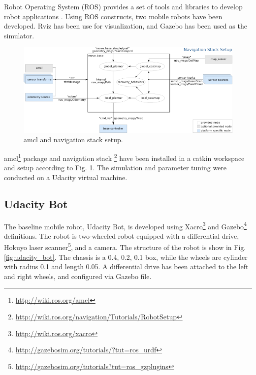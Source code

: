 \documentclass[10pt,journal,compsoc]{IEEEtran}
\begin{document}
Robot Operating System (ROS) provides a set of tools and libraries to develop robot applications \cite{288}. Using ROS constructs, two mobile robots have been developed.  Rviz has been use for visualization, and Gazebo has been used as the simulator. 

\begin{figure}[thpb]
      \centering
      \includegraphics[width=\linewidth]{misc/overview_tf_small.png}
      \caption{amcl and navigation stack setup.}
      \label{fig:nav_stack}
\end{figure}

amcl\footnote{\url{http://wiki.ros.org/amcl}} package and navigation stack \footnote{\url{http://wiki.ros.org/navigation/Tutorials/RobotSetup}} have been installed in a catkin workspace and setup according to Fig. \ref{fig:nav_stack}. The simulation and parameter tuning were conducted on a Udacity virtual machine.

\subsection{Udacity Bot}

The baseline mobile robot, Udacity Bot, is developed using Xacro\footnote{\url{http://wiki.ros.org/xacro}} and Gazebo\footnote{\url{http://gazebosim.org/tutorials/?tut=ros_urdf}} definitions. The robot is two-wheeled robot equipped with a differential drive, Hokuyo laser scanner\footnote{\url{http://gazebosim.org/tutorials?tut=ros_gzplugins}}, and a camera. The structure of the robot is show in Fig. \ref{fig:udacity_bot}. The chassis is a 0.4, 0.2, 0.1 box, while the wheels are cylinder with radius 0.1 and length 0.05.  A differential drive has been attached to the left and right wheels, and configured via Gazebo file. 
\end{document}
